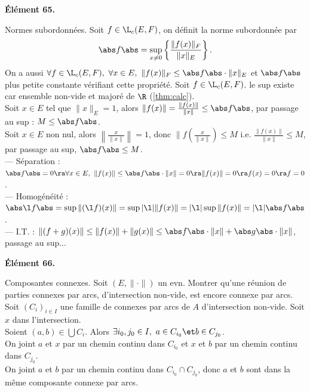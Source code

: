 \documentclass[11pt]{article}
\begin{document}
\pagebreak

\begin{center}
    \bf{Élément 65.}
\end{center}

\begin{defi}{Normes subordonnées.}{}
    Soit $f\in\L_c(E,F)$, on définit la norme subordonnée par
    \begin{equation*}
        \abs f \abs = \sup_{x\neq0}\left\{\frac{\|f(x)\|_F}{\|x\|_E}\right\}.
    \end{equation*}
    On a aussi $\forall f \in \L_c(E,F), ~ \forall x \in E, ~ \|f(x)\|_F \leq \abs f \abs \cdot \|x\|_E$ et $\abs f \abs$ plus petite constante vérifiant cette propriété.
    \tcblower
    Soit $f\in\L_c(E,F)$. le sup existe car ensemble non-vide et majoré de $\R$ (\ref{thm:calc}).\\
    Soit $x\in E$ tel que $\|x\|_E=1$, alors $\|f(x)\|=\frac{\|f(x)\|}{\|x\|}\leq\abs f \abs$, par passage au sup : $M\leq \abs f \abs$.\\
    Soit $x\in E$ non nul, alors $\left\|\frac{x}{\|x\|}\right\|=1$, donc $\|f\left( \frac{x}{\|x\|}  \right) \leq M$ i.e. $\frac{\|f(x)\|}{\|x\|}\leq M$, par passage au sup, $\abs f \abs \leq M$.\\
    --- Séparation : $\abs f \abs = 0 \ra \forall x \in E, ~ \| f(x) \| \leq \abs f \abs\cdot\|x\|=0 \ra \|f(x)\|=0 \ra f(x)=0\ra f=0$.\\
    --- Homogénéité : $\abs \l f \abs = \sup \|(\l f)(x)\| = \sup |\l|\|f(x)\| = |\l| \sup \|f(x)\| = |\l| \abs f \abs$.\\
    --- I.T. : $\|(f+g)(x)\|\leq\|f(x)\|+\|g(x)\|\leq \abs f \abs\cdot\|x\| + \abs g \abs\cdot\|x\|$, passage au sup...
\end{defi}

\begin{center}
    \bf{Élément 66.}
\end{center}

\begin{ex}{Composantes connexes.}{}
    Soit $(E,\|\cdot\|)$ un evn. Montrer qu'une réunion de parties connexes par arcs, d'intersection non-vide, est encore connexe par arcs.
    \tcblower
     Soit $(C_i)_{i\in I}$ une famille de connexes par arcs de $A$ d'intersection non-vide. Soit $x$ dans l'intersection.\\
    Soient $(a,b)\in\bigcup C_i$. Alors $\exists i_0,j_0 \in I, ~ a\in C_{i_0} \et b\in C_{j_0}$.\\
    On joint $a$ et $x$ par un chemin continu dans $C_{i_0}$ et $x$ et $b$ par un chemin continu dans $C_{j_0}$.\\
    On joint $a$ et $b$ par un chemin continu dans $C_{i_0}\cap C_{j_0}$, donc $a$ et $b$ sont dans la même composante connexe par arcs.
\end{ex}
\end{document}
